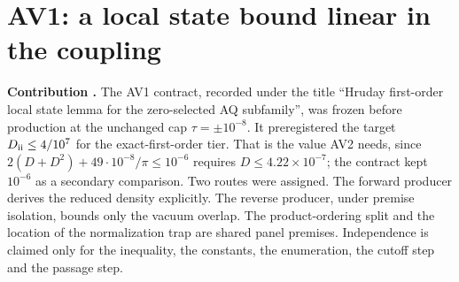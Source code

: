 \section{AV1: a local state bound linear in the coupling}
\label{sec:av1}

\textbf{Contribution .} The AV1 contract, recorded under
the title ``Hruday first-order local state lemma for the zero-selected AQ
subfamily'', was frozen before production at the unchanged cap
$\tau=\pm10^{-8}$. It preregistered the target $D_{\rm ii}\le4/10^7$ for the
exact-first-order tier. That is the value AV2 needs, since
$2(D+D^2)+49\cdot10^{-8}/\pi\le10^{-6}$ requires $D\le4.22\times10^{-7}$; the
contract kept $10^{-6}$ as a secondary comparison. Two routes were assigned.
The forward producer derives the reduced density explicitly. The reverse
producer, under premise isolation, bounds only the vacuum overlap. The
product-ordering split and the location of the normalization trap are shared
panel premises. Independence is claimed only for the inequality, the
constants, the enumeration, the cutoff step and the passage step.

